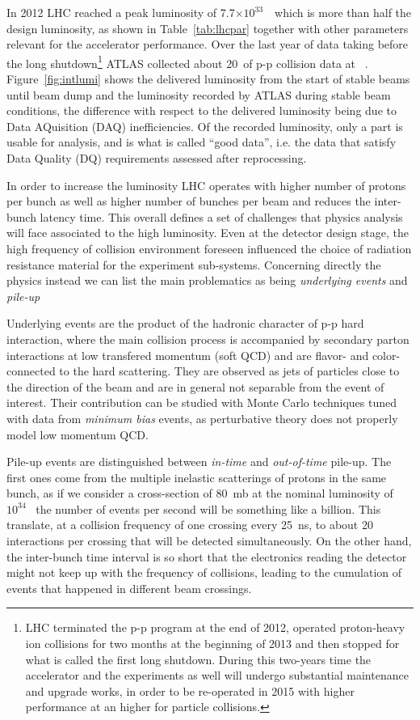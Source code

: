 In 2012 LHC reached a peak luminosity of 7.7$\times10^{33}$~\ which is
more than half the design luminosity, as shown in Table~\ref{tab:lhcpar} together
with other parameters relevant for the accelerator performance. Over the last
year of data taking before the long shutdown\footnote{LHC terminated the p-p program
at the end of 2012, operated proton-heavy ion collisions for two months at the beginning
of 2013 and then stopped for what is called the first long shutdown. During this two-years
time the accelerator and the experiments as well will undergo substantial maintenance and 
upgrade works, in order to be re-operated in 2015 with higher performance at an higher
\cme for particle collisions.}
ATLAS collected about 20\ifb\ of p-p collision data at ~\tev.
Figure~\ref{fig:intlumi} shows the delivered luminosity from the start of stable beams until beam dump and the luminosity recorded by
ATLAS during stable beam conditions, the difference with respect to the delivered luminosity being due to Data AQuisition (DAQ)
inefficiencies. Of the recorded luminosity, only a part is usable for analysis, and is what is called ``good data'', i.e. 
the data that satisfy Data Quality (DQ) requirements assessed after reprocessing.

In order to increase the luminosity LHC operates with higher number of protons per bunch as well as higher
 number of bunches per beam and reduces the inter-bunch latency time.
This overall defines a set of challenges that physics analysis will face associated to the high luminosity.
Even at the detector design stage, the high frequency of collision environment foreseen influenced
the choice of radiation resistance material for the experiment sub-systems. Concerning directly the physics
instead we can list the main problematics as being \textit{underlying events} and \textit{pile-up}

Underlying events are the product of the hadronic character of p-p hard interaction, where the main collision process
is accompanied by secondary parton interactions at low transfered momentum (soft QCD) and are flavor- and color-connected to the
hard scattering. They are observed as jets of particles close to the direction of the beam and are in general not 
separable from the event of interest. Their contribution can be studied with Monte Carlo techniques tuned with data from 
\textit{minimum bias} events, as perturbative theory does not properly model low momentum QCD.


Pile-up events are distinguished between \textit{in-time} and \textit{out-of-time} pile-up. The first ones come 
from the multiple inelastic scatterings of protons in the same bunch, as if we consider a cross-section of 80~mb
at the nominal luminosity of $10^{34}$~ the number of events per second will be something like
a billion. This translate, at a collision frequency of one crossing every 25~ns, to about 20 interactions per
crossing that will be detected simultaneously. On the other hand, the inter-bunch time interval is so short
that the electronics reading the detector might not keep up with the frequency of collisions, leading to the
cumulation of events that happened in different beam crossings.

